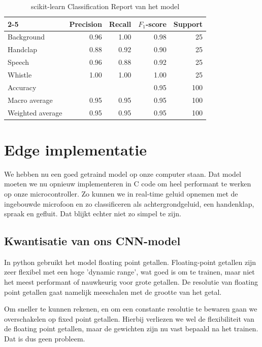 \begin{table}[ht]
	\centering
	\begin{tabular}{ |l|r|r|r|r| }
		\cline{2-5}
		\multicolumn{1}{c| }{} & Precision & Recall & \( F_1 \)-score & Support \\
		\hline
		Background             & 0.96      & 1.00   & 0.98            & 25      \\
		Handclap               & 0.88      & 0.92   & 0.90            & 25      \\
		Speech                 & 0.96      & 0.88   & 0.92            & 25      \\
		Whistle                & 1.00      & 1.00   & 1.00            & 25      \\

		\hline\hline
		Accuracy               &           &        & 0.95            & 100     \\
		Macro average          & 0.95      & 0.95   & 0.95            & 100     \\
		Weighted average       & 0.95      & 0.95   & 0.95            & 100     \\
		\hline
	\end{tabular}
	\caption{scikit-learn Classification Report van het model}
	\label{tab:classification-report}
\end{table}

\section{Edge implementatie}
We hebben nu een goed getraind model op onze computer staan. Dat model moeten we nu opnieuw implementeren in C code om heel performant te werken op onze microcontroller. Zo kunnen we in real-time geluid opnemen met de ingebouwde microfoon en zo classificeren als achtergrondgeluid, een handenklap, spraak en gefluit. Dat blijkt echter niet zo simpel te zijn.

\subsection{Kwantisatie van ons CNN-model}
In python gebruikt het model floating point getallen. Floating-point getallen zijn zeer flexibel met een hoge 'dynamic range', wat goed is om te trainen, maar niet het meest performant of nauwkeurig voor grote getallen.
De resolutie van floating point getallen gaat namelijk meeschalen met de grootte van het getal. \cite{enwiki:floating-point}

Om sneller te kunnen rekenen, en om een constante resolutie te bewaren gaan we overschakelen op fixed point getallen. \cite{enwiki:q-format} Hierbij verliezen we wel de flexibiliteit van de floating point getallen, maar de gewichten zijn nu vast bepaald na het trainen. Dat is dus geen probleem.

